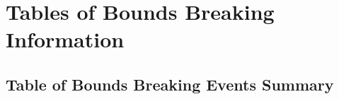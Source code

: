 %
% 
% 
%
%
\section{Tables of Bounds Breaking Information}

\subsection{Table of Bounds Breaking Events Summary}

%

